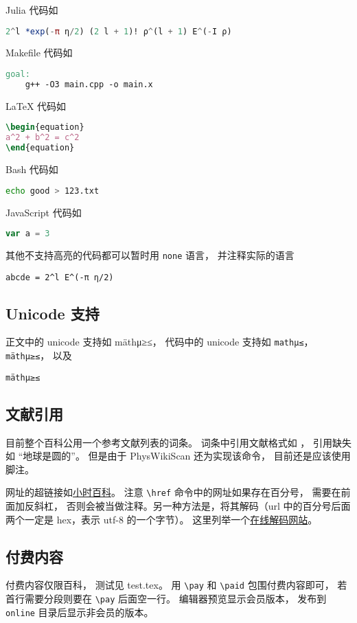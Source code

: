Julia 代码如
\begin{lstlisting}[language=julia]
2^l *exp(-π η/2) (2 l + 1)! ρ^(l + 1) E^(-I ρ)
\end{lstlisting}

Makefile 代码如
\begin{lstlisting}[language=Makefile]
goal:
    g++ -O3 main.cpp -o main.x
\end{lstlisting}

LaTeX 代码如
\begin{lstlisting}[language=latex]
\begin{equation}
a^2 + b^2 = c^2
\end{equation}
\end{lstlisting}

Bash 代码如
\begin{lstlisting}[language=bash]
echo good > 123.txt
\end{lstlisting}

JavaScript 代码如
\begin{lstlisting}[language=js]
var a = 3
\end{lstlisting}

其他不支持高亮的代码都可以暂时用 \verb|none| 语言， 并注释实际的语言
\begin{lstlisting}[language=none]
abcde = 2^l E^(-π η/2)
\end{lstlisting}

\subsection{Unicode 支持}
正文中的 unicode 支持如 mäthμ≥≤， 代码中的 unicode 支持如 \verb|mathμ≤|， \lstinline|mäthμ≥≤|， 以及
\begin{lstlisting}[language=none]
mäthμ≥≤
\end{lstlisting}


\subsection{文献引用}
目前整个百科公用一个参考文献列表的词条。 词条中引用文献格式如 \cite{PhysWiki}， 引用缺失如 “地球是圆的\needCite”。 但是由于 PhysWikiScan 还为实现该命令， 目前还是应该使用脚注。

网址的超链接如\href{https://wuli.wiki}{小时百科}。 注意 \verb|\href| 命令中的网址如果存在百分号， 需要在前面加反斜杠， 否则会被当做注释。另一种方法是，将其解码（url 中的百分号后面两个一定是 hex，表示 utf-8 的一个字节）。 这里列举一个\href{https://www.webatic.com/url-convertor}{在线解码网站}。

\subsection{付费内容}
付费内容仅限百科， 测试见 test.tex。 用 \verb|\pay| 和 \verb|\paid| 包围付费内容即可， 若首行需要分段则要在 \verb|\pay| 后面空一行。 编辑器预览显示会员版本， 发布到 \verb|online| 目录后显示非会员的版本。

